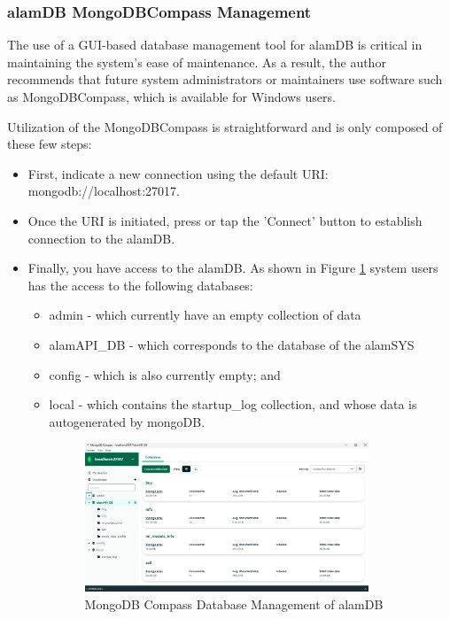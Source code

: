 \subsubsection{alamDB MongoDBCompass Management}
\label{subsubsec:alamBB_docker_management}
The use of a GUI-based database management tool for alamDB is critical 
in maintaining the system's ease of maintenance. As a result, the author 
recommends that future system administrators or maintainers use software 
such as MongoDBCompass, which is available for Windows users.

Utilization of the MongoDBCompass is straightforward and is only composed of
these few steps:
\begin{itemize}
    \item[(a)] First, indicate a new connection using the default URI: 
    mongodb://localhost:27017.
    \item[(b)] Once the URI is initiated, press or tap the 'Connect' button
    to establish connection to the alamDB.
    \item[(c)] Finally, you have access to the alamDB. As shown in Figure
    \ref{fig:mongodb_compass} system users has the access to the following databases:
    \begin{itemize}
        \item[1.] admin - which currently have an empty collection of data
        \item[2.] alamAPI\_DB - which corresponds to the database of the alamSYS
        \item[3.] config - which is also currently empty; and 
        \item[4.] local - which contains the startup\_log collection, and whose data is autogenerated by mongoDB.
        \begin{figure}[ht]
            \centering
            \includegraphics[width=0.85\textwidth]{./assets/Chapter_4/Documentation/mongodb_compass.png}
            \caption{MongoDB Compass Database Management of alamDB}
            \label{fig:mongodb_compass}
        \end{figure}
        \FloatBarrier
    \end{itemize}
\end{itemize}